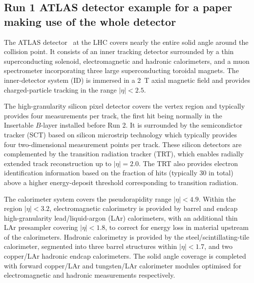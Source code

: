 \subsection{Run 1 ATLAS detector example for a paper making use of the whole detector}
\label{sec:atlas2}

The ATLAS detector~\cite{PERF-2007-01} at the LHC covers nearly the entire solid angle around the collision point.
It consists of an inner tracking detector surrounded by a thin superconducting solenoid, electromagnetic and hadronic calorimeters,
and a muon spectrometer incorporating three large superconducting toroidal magnets.
The inner-detector system (ID) is immersed in a \SI{2}{\tesla} axial magnetic field 
and provides charged-particle tracking in the range \(|\eta| < 2.5\).

The high-granularity silicon pixel detector covers the vertex region and typically provides four measurements per track, 
the first hit being normally in the Insertable $B$-layer installed before Run 2.
It is surrounded by the semicondictor tracker (SCT) based on silicon microstrip technology which typically provides four two-dimensional measurement points per track.
These silicon detectors are complemented by the transition radiation tracker (TRT),
which enables radially extended track reconstruction up to \(|\eta| = 2.0\). 
The TRT also provides electron identification information 
based on the fraction of hits (typically 30 in total) above a higher energy-deposit threshold corresponding to transition radiation.

The calorimeter system covers the pseudorapidity range \(|\eta| < 4.9\).
Within the region \(|\eta|< 3.2\), electromagnetic calorimetry is provided by barrel and 
endcap high-granularity lead/liquid-argon (LAr) calorimeters,
with an additional thin LAr presampler covering \(|\eta| < 1.8\),
to correct for energy loss in material upstream of the calorimeters.
Hadronic calorimetry is provided by the steel/scintillating-tile calorimeter,
segmented into three barrel structures within \(|\eta| < 1.7\), and two copper/LAr hadronic endcap calorimeters.
The solid angle coverage is completed with forward copper/LAr and tungsten/LAr calorimeter modules
optimised for electromagnetic and hadronic measurements respectively.

